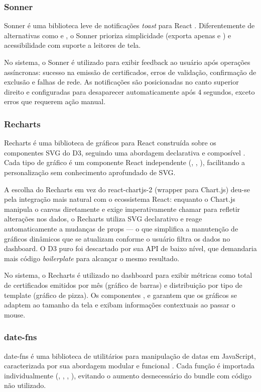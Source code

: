 \subsubsection{Sonner}
Sonner é uma biblioteca leve de notificações \textit{toast} para React \cite{sonner2025}. Diferentemente de alternativas como  e , o Sonner prioriza simplicidade (exporta apenas  e ) e acessibilidade com suporte a leitores de tela.

No sistema, o Sonner é utilizado para exibir feedback ao usuário após operações assíncronas: sucesso na emissão de certificados, erros de validação, confirmação de exclusão e falhas de rede. As notificações são posicionadas no canto superior direito e configuradas para desaparecer automaticamente após 4 segundos, exceto erros que requerem ação manual.

\subsubsection{Recharts}
Recharts é uma biblioteca de gráficos para React construída sobre os componentes SVG do D3, seguindo uma abordagem declarativa e composível \cite{recharts2025}. Cada tipo de gráfico é um componente React independente (, , ), facilitando a personalização sem conhecimento aprofundado de SVG.

A escolha do Recharts em vez do react-chartjs-2 (wrapper para Chart.js) deu-se pela integração mais natural com o ecossistema React: enquanto o Chart.js manipula o canvas diretamente e exige imperativamente chamar  para refletir alterações nos dados, o Recharts utiliza SVG declarativo e reage automaticamente a mudanças de props — o que simplifica a manutenção de gráficos dinâmicos que se atualizam conforme o usuário filtra os dados no dashboard. O D3 puro foi descartado por sua API de baixo nível, que demandaria mais código \textit{boilerplate} para alcançar o mesmo resultado.

No sistema, o Recharts é utilizado no dashboard para exibir métricas como total de certificados emitidos por mês (gráfico de barras) e distribuição por tipo de template (gráfico de pizza). Os componentes ,  e  garantem que os gráficos se adaptem ao tamanho da tela e exibam informações contextuais ao passar o mouse.

\subsubsection{date-fns}
date-fns é uma biblioteca de utilitários para manipulação de datas em JavaScript, caracterizada por sua abordagem modular e funcional \cite{datefns2025}. Cada função é importada individualmente (, , , ), evitando o aumento desnecessário do bundle com código não utilizado.

